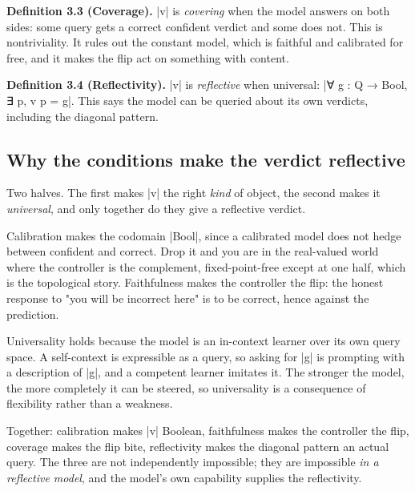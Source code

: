 \documentclass{memoir}
\begin{document}
\textbf{Definition 3.3 (Coverage).} \LeanVerb|v| is \emph{covering} when the model answers on both sides:
some query gets a correct confident verdict and some does not. This is
nontriviality. It rules out the constant model, which is faithful and calibrated
for free, and it makes the flip act on something with content.

\textbf{Definition 3.4 (Reflectivity).} \LeanVerb|v| is \emph{reflective} when universal:
\LeanVerb|∀ g : Q → Bool, ∃ p, v p = g|. This says the model can be queried about its own
verdicts, including the diagonal pattern.



\subsection{Why the conditions make the verdict reflective}\label{Two--Schemas--of--Impossibility-005F-005F-005F--Machine--Checked--Limits--of--Trustworthy--Machine--Learning-005F-005F-005F--and--Why--They--Tighten--with--Capability----Three--Trilemmata-005F-005F-005F--One--Theorem----The--Hallucination--Trilemma----Why--the--conditions--make--the--verdict--reflective}

Two halves. The first makes \LeanVerb|v| the right \emph{kind} of object, the second makes it
\emph{universal}, and only together do they give a reflective verdict.

Calibration makes the codomain \LeanVerb|Bool|, since a calibrated model does not hedge
between confident and correct. Drop it and you are in the real-valued world
where the controller is the complement, fixed-point-free except at one half,
which is the topological story. Faithfulness makes the controller the flip: the
honest response to "you will be incorrect here" is to be correct, hence against
the prediction.

Universality holds because the model is an in-context learner over its own query
space. A self-context is expressible as a query, so asking for \LeanVerb|g| is prompting
with a description of \LeanVerb|g|, and a competent learner imitates it. The stronger the
model, the more completely it can be steered, so universality is a consequence
of flexibility rather than a weakness.

Together: calibration makes \LeanVerb|v| Boolean, faithfulness makes the controller the
flip, coverage makes the flip bite, reflectivity makes the diagonal pattern an
actual query. The three are not independently impossible; they are impossible
\emph{in a reflective model}, and the model's own capability supplies the
reflectivity.
\end{document}
